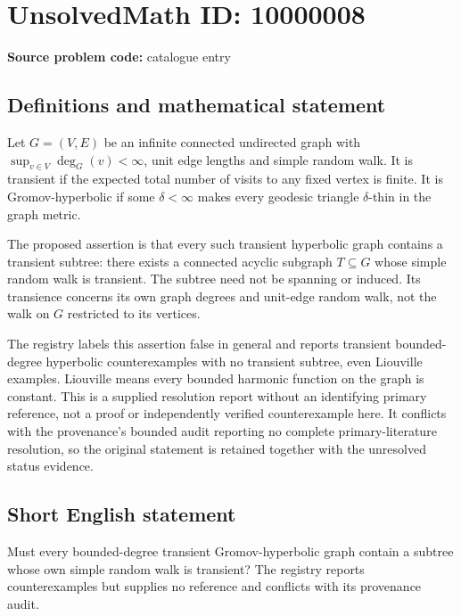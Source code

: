 \documentclass[11pt]{article}
\begin{document}
\section*{UnsolvedMath ID: 10000008}
\textbf{Source problem code:} catalogue entry
\subsection{Definitions and mathematical statement}
Let \(G=(V,E)\) be an infinite connected undirected graph with \(\sup_{v\in V}\deg_G(v)<\infty\), unit edge lengths and simple random walk. It is transient if the expected total number of visits to any fixed vertex is finite. It is Gromov-hyperbolic if some \(\delta<\infty\) makes every geodesic triangle \(\delta\)-thin in the graph metric.

The proposed assertion is that every such transient hyperbolic graph contains a transient subtree: there exists a connected acyclic subgraph \(T\subseteq G\) whose simple random walk is transient. The subtree need not be spanning or induced. Its transience concerns its own graph degrees and unit-edge random walk, not the walk on \(G\) restricted to its vertices.

The registry labels this assertion false in general and reports transient bounded-degree hyperbolic counterexamples with no transient subtree, even Liouville examples. Liouville means every bounded harmonic function on the graph is constant. This is a supplied resolution report without an identifying primary reference, not a proof or independently verified counterexample here. It conflicts with the provenance's bounded audit reporting no complete primary-literature resolution, so the original statement is retained together with the unresolved status evidence.
\subsection{Short English statement}
Must every bounded-degree transient Gromov-hyperbolic graph contain a subtree whose own simple random walk is transient? The registry reports counterexamples but supplies no reference and conflicts with its provenance audit.
\end{document}
